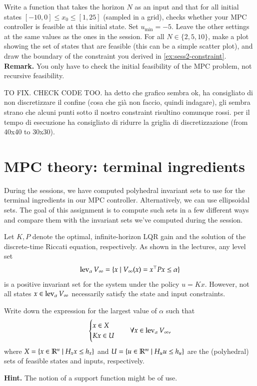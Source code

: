 \documentclass[]{article}
\begin{document}
\begin{assignment} \label{ex:extra-1}
	Write a function that takes the horizon $N$ as an input and that 
	for all initial states $[-10, 0] \leq x_0 \leq [1, 25]$ (sampled in a grid), checks whether your MPC controller is feasible at this initial state.
	Set $u_{\min} = -5$.
	Leave the other settings at the same values as the ones in the session.
	For all $N \in \{2, 5, 10\}$, make a plot showing the set of states that are feasible (this can be a simple scatter plot), 
	and draw the boundary of the constraint you derived in \cref{ex:sess2-constraint}. 
	\textbf{Remark.} You only have to check the initial feasibility of the MPC problem, not recursive feasibility.
\end{assignment}

\begin{flushleft}
TO FIX.
CHECK CODE TOO.
ha detto che grafico sembra ok, ha consigliato di non discretizzare il confine (cosa che già non faccio, quindi indagare), gli sembra strano che alcuni punti sotto il nostro constraint risultino comunque rossi.
per il tempo di esecuzione ha consigliato di ridurre la griglia di discretizzazione (from 40x40 to 30x30).
\end{flushleft}



\newpage
\section{MPC theory: terminal ingredients}
During the sessions, we have computed polyhedral invariant sets to use 
for the terminal ingredients in our MPC controller. 
Alternatively, we can use ellipsoidal sets. 
The goal of this assignment is to compute such sets in a few different ways 
and compare them with the invariant sets we've computed during 
the session.

\begin{assignment} \label{sess3:assign-lqr}
	Let $K, P$ denote the optimal, infinite-horizon LQR gain and the solution of 
	the discrete-time Riccati equation, respectively. As shown in the lectures, 
	any level set
	\[ 
		\operatorname{lev}_{\alpha} V_{\infty} = \{x \mid V_{\infty}(x) = x^\top P x \leq \alpha\}
	\]
	is a positive invariant set for the system under the policy $u = Kx$. However, 
	not all states $x \in \operatorname{lev}_{\alpha} V_{\infty}$ necessarily satisfy the state and input constraints. 

	Write down the expression for the largest value of $\alpha$ 
	such that
	\[ 
	\begin{cases}
		x \in X \\
		Kx \in U  
	\end{cases} \quad \forall x \in \operatorname{lev}_{\alpha} V_{\infty},
	\]
	where $X = \{x \in \mathbb{R}^n \mid H_x x \leq h_x\}$ and $U = \{u \in \mathbb{R}^m \mid H_u u \leq h_u \}$ are 
	the (polyhedral) sets of feasible states and inputs, respectively.

	\textbf{Hint.} The notion of a support function might be of use.
\end{assignment}
\end{document}
